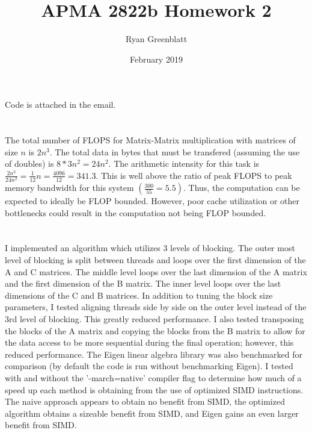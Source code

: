 \documentclass{article}
\title{APMA 2822b Homework 2}
\author{Ryan Greenblatt}
\date{February 2019}
\begin{document}
\setlength\parindent{0pt}

\renewcommand{\thesubsection}{\alph{subsection}}

\maketitle

\section{}

Code is attached in the email.

\section{}


The total number of FLOPS for Matrix-Matrix multiplication with matrices of size $n$ is $2 n^3$. The 
total data in bytes that must be transfered (assuming the use of doubles) is 
$8 * 3 n^2 = 24 n^2$. The arithmetic intensity for this task is 
$\frac{2n^3}{24n^2} = \frac1{12} n = \frac{4096}{12} = 341.3$. This is well above the ratio of
peak FLOPS to peak memory bandwidth for this system $(\frac{300}{55} = 5.5)$. Thus, the 
computation can be expected to ideally be FLOP bounded. However, poor cache utilization
or other bottlenecks could result in the computation not being FLOP bounded.

\section{}

I implemented an algorithm which utilizes 3 levels of blocking. The outer most level 
of blocking is split between threads and loops over the first dimension of the A 
and C matrices.  The middle level loops over the last dimension of the A matrix 
and the first dimension of the B matrix.  The inner level loops over the last dimensions 
of the C and B matrices. In addition to tuning the block size parameters, I tested 
aligning threads side by side on the outer level instead of the 3rd level of blocking. 
This greatly reduced performance. I also tested transposing the blocks of the A 
matrix and copying the blocks from the B matrix to allow for the data access to 
be more sequential during the final operation; however, this reduced performance.  
The Eigen linear algebra library was also benchmarked for comparison (by default 
the code is run without benchmarking Eigen).  I tested with and without the '-march=native' 
compiler flag to determine how much of a speed up each method is obtaining from 
the use of optimized SIMD instructions. The naive approach appears to obtain no 
benefit from SIMD, the optimized algorithm obtains a sizeable benefit from SIMD, 
and Eigen gains an even larger benefit from SIMD.
\end{document}
